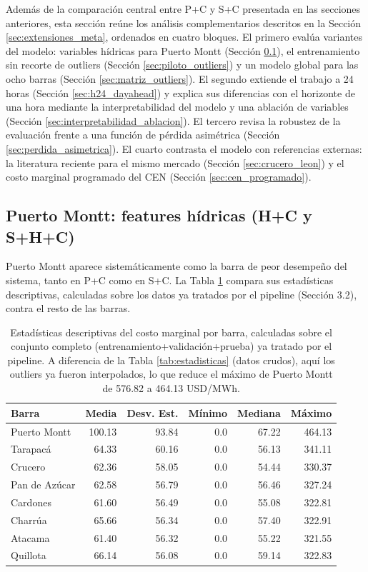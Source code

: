 Además de la comparación central entre P+C y S+C presentada en las secciones anteriores, esta sección reúne los análisis complementarios descritos en la Sección \ref{sec:extensiones_meta}, ordenados en cuatro bloques. El primero evalúa variantes del modelo: variables hídricas para Puerto Montt (Sección \ref{sec:pmontt_desempeno}), el entrenamiento sin recorte de outliers (Sección \ref{sec:piloto_outliers}) y un modelo global para las ocho barras (Sección \ref{sec:matriz_outliers}). El segundo extiende el trabajo a 24 horas (Sección \ref{sec:h24_dayahead}) y explica sus diferencias con el horizonte de una hora mediante la interpretabilidad del modelo y una ablación de variables (Sección \ref{sec:interpretabilidad_ablacion}). El tercero revisa la robustez de la evaluación frente a una función de pérdida asimétrica (Sección \ref{sec:perdida_asimetrica}). El cuarto contrasta el modelo con referencias externas: la literatura reciente para el mismo mercado (Sección \ref{sec:crucero_leon}) y el costo marginal programado del CEN (Sección \ref{sec:cen_programado}).

\subsection{Puerto Montt: features hídricas (H+C y S+H+C)}
\label{sec:pmontt_desempeno}

Puerto Montt aparece sistemáticamente como la barra de peor desempeño del sistema, tanto en P+C como en S+C. La Tabla \ref{tab:pmontt_stats} compara sus estadísticas descriptivas, calculadas sobre los datos ya tratados por el pipeline (Sección 3.2), contra el resto de las barras.

\begin{table}[htbp]
    \centering
    \begin{tabular}{lrrrrr}
        \toprule
        Barra & Media & Desv. Est. & Mínimo & Mediana & Máximo \\
        \midrule
        Puerto Montt  & 100.13 & 93.84 & 0.0 & 67.22 & 464.13 \\
        Tarapacá      & 64.33  & 60.16 & 0.0 & 56.13 & 341.11 \\
        Crucero       & 62.36  & 58.05 & 0.0 & 54.44 & 330.37 \\
        Pan de Azúcar & 62.58  & 56.79 & 0.0 & 56.46 & 327.24 \\
        Cardones      & 61.60  & 56.49 & 0.0 & 55.08 & 322.81 \\
        Charrúa       & 65.66  & 56.34 & 0.0 & 57.40 & 322.91 \\
        Atacama       & 61.40  & 56.32 & 0.0 & 55.22 & 321.55 \\
        Quillota      & 66.14  & 56.08 & 0.0 & 59.14 & 322.83 \\
        \bottomrule
    \end{tabular}
    \caption{Estadísticas descriptivas del costo marginal por barra, calculadas sobre el conjunto completo (entrenamiento+validación+prueba) ya tratado por el pipeline. A diferencia de la Tabla \ref{tab:estadisticas} (datos crudos), aquí los outliers ya fueron interpolados, lo que reduce el máximo de Puerto Montt de 576.82 a 464.13 USD/MWh.}
    \label{tab:pmontt_stats}
\end{table}

